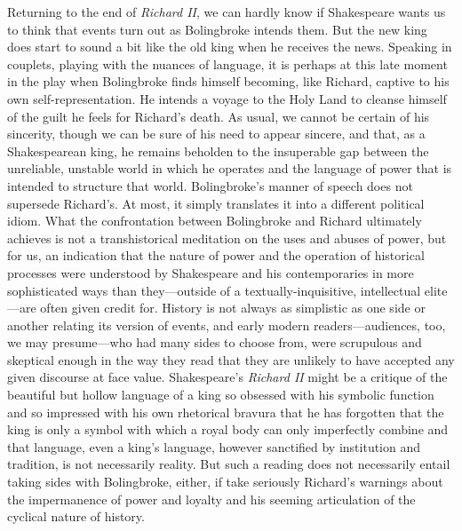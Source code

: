 Returning to the end of \emph{Richard II}, we can hardly know if Shakespeare wants us to think that events turn out as Bolingbroke intends them.
But the new king does start to sound a bit like the old king when he receives the news.
Speaking in couplets, playing with the nuances of language, it is perhaps at this late moment in the play when Bolingbroke finds himself becoming, like Richard, captive to his own self-representation.
He intends a voyage to the Holy Land to cleanse himself of the guilt he feels for Richard’s death.
As usual, we cannot be certain of his sincerity, though we can be sure of his need to appear sincere, and that, as a Shakespearean king, he remains beholden to the insuperable gap between the unreliable, unstable world in which he operates and the language of power that is intended to structure that world.
Bolingbroke’s manner of speech does not supersede Richard’s.
At most, it simply translates it into a different political idiom.
What the confrontation between Bolingbroke and Richard ultimately achieves is not a transhistorical meditation on the uses and abuses of power, but for us, an indication that the nature of power and the operation of historical processes were understood by Shakespeare and his contemporaries in more sophisticated ways than they---outside of a textually-inquisitive, intellectual elite---are often given credit for.
History is not always as simplistic as one side or another relating its version of events, and early modern readers---audiences, too, we may presume---who had many sides to choose from, were scrupulous and skeptical enough in the way they read that they are unlikely to have accepted any given discourse at face value.
Shakespeare’s \emph{Richard II} might be a critique of the beautiful but hollow language of a king so obsessed with his symbolic function and so impressed with his own rhetorical bravura that he has forgotten that the king is only a symbol with which a royal body can only imperfectly combine and that language, even a king’s language, however sanctified by institution and tradition, is not necessarily reality.
But such a reading does not necessarily entail taking sides with Bolingbroke, either, if take seriously Richard’s warnings about the impermanence of power and loyalty and his seeming articulation of the cyclical nature of history.

